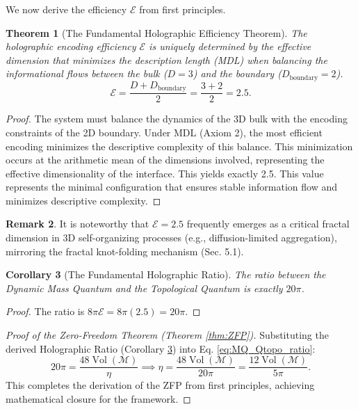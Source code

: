 \documentclass[11pt, a4paper]{article}
\newtheorem{theorem}{Theorem}[section]
\newtheorem{corollary}[theorem]{Corollary}
\theoremstyle{definition}
\theoremstyle{definition}
\newtheorem{remark}[theorem]{Remark}
\newcommand{\M}{\mathcal{M}}
\newcommand{\Vol}{\operatorname{Vol}}
\newcommand{\Veight}{\Vol(\M)}
\newcommand{\Ecal}{\mathcal{E}} %
\newcommand{\Dboundary}{D_{\mathrm{boundary}}}
\begin{document}
We now derive the efficiency $\Ecal$ from first principles.

\begin{theorem}[The Fundamental Holographic Efficiency Theorem]\label{thm:HolographicEfficiency}
The holographic encoding efficiency $\Ecal$ is uniquely determined by the effective dimension that minimizes the description length (MDL) when balancing the informational flows between the bulk ($D=3$) and the boundary ($\Dboundary=2$).
\begin{equation}
    \Ecal = \frac{D + \Dboundary}{2} = \frac{3+2}{2} = 2.5.
\end{equation}
\end{theorem}
\begin{proof}
The system must balance the dynamics of the 3D bulk with the encoding constraints of the 2D boundary. Under MDL (Axiom 2), the most efficient encoding minimizes the descriptive complexity of this balance. This minimization occurs at the arithmetic mean of the dimensions involved, representing the effective dimensionality of the interface. This yields exactly 2.5. This value represents the minimal configuration that ensures stable information flow and minimizes descriptive complexity.
\end{proof}

\begin{remark}
It is noteworthy that $\Ecal=2.5$ frequently emerges as a critical fractal dimension in 3D self-organizing processes (e.g., diffusion-limited aggregation), mirroring the fractal knot-folding mechanism (Sec. 5.1).
\end{remark}


\begin{corollary}[The Fundamental Holographic Ratio]\label{cor:HolographicRatio}
The ratio between the Dynamic Mass Quantum and the Topological Quantum is exactly $20\pi$.
\end{corollary}
\begin{proof}
The ratio is $8\pi \Ecal = 8\pi (2.5) = 20\pi$.
\end{proof}

\begin{proof}[Proof of the Zero-Freedom Theorem (Theorem \ref{thm:ZFP})]
Substituting the derived Holographic Ratio (Corollary \ref{cor:HolographicRatio}) into Eq. \eqref{eq:MQ_Qtopo_ratio}:
\begin{equation}
    20\pi = \frac{48 \Veight}{\eta} \implies \eta = \frac{48 \Veight}{20\pi} = \frac{12 \Veight}{5\pi}.
\end{equation}
This completes the derivation of the ZFP from first principles, achieving mathematical closure for the framework.
\end{proof}
\end{document}
